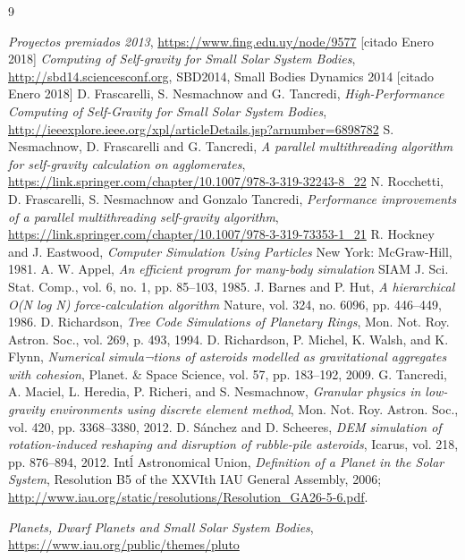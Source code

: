 \documentclass[a4paper,11pt]{book}
\begin{document}
\begin{thebibliography}{9}

	 \textit{Proyectos premiados 2013}, \url{https://www.fing.edu.uy/node/9577} [citado Enero  2018]
	 \textit{Computing of Self-gravity for Small Solar System Bodies}, \url{http://sbd14.sciencesconf.org}, SBD2014, Small Bodies Dynamics 2014 [citado Enero  2018]
	 D. Frascarelli, S. Nesmachnow and G. Tancredi, \textit{High-Performance Computing of Self-Gravity for Small Solar System Bodies}, \url{http://ieeexplore.ieee.org/xpl/articleDetails.jsp?arnumber=6898782}
	 S. Nesmachnow, D. Frascarelli and G. Tancredi, \textit{A parallel multithreading algorithm for self-gravity calculation on agglomerates}, \url{https://link.springer.com/chapter/10.1007/978-3-319-32243-8_22}
	 N. Rocchetti, D. Frascarelli, S. Nesmachnow and Gonzalo Tancredi, \textit{Performance improvements of a parallel multithreading self-gravity algorithm}, \url{https://link.springer.com/chapter/10.1007/978-3-319-73353-1_21}
	 R. Hockney and J. Eastwood, \textit{Computer Simulation Using Particles} New York: McGraw-Hill, 1981.
	 A. W. Appel, \textit{An efficient program for many-body simulation} SIAM J. Sci. Stat. Comp., vol. 6, no. 1, pp. 85–103, 1985.
	 J. Barnes and P. Hut, \textit{A hierarchical O(N log N) force-calculation algorithm} Nature, vol. 324, no. 6096, pp. 446–449, 1986.
	 D. Richardson, \textit{Tree Code Simulations of Planetary Rings}, Mon. Not. Roy. Astron. Soc., vol. 269, p. 493, 1994.
	 D. Richardson, P. Michel, K. Walsh, and K. Flynn, \textit{Numerical simula¬tions of asteroids modelled as gravitational aggregates with cohesion}, Planet. \& Space Science, vol. 57, pp. 183–192, 2009.
	 G. Tancredi, A. Maciel, L. Heredia, P. Richeri, and S. Nesmachnow, \textit{Granular physics in low-gravity environments using discrete element method}, Mon. Not. Roy. Astron. Soc., vol. 420, pp. 3368–3380, 2012.
	 D. Sánchez and D. Scheeres, \textit{DEM simulation of rotation-induced reshaping and disruption of rubble-pile asteroids}, Icarus, vol. 218, pp. 876–894, 2012.
	 Int\'l Astronomical Union, \textit{Definition of a Planet in the Solar System}, Resolution B5 of the XXVIth IAU General Assembly, 2006; \url{http://www.iau.org/static/resolutions/Resolution_GA26-5-6.pdf}.

	 \textit{Planets, Dwarf Planets and Small Solar System Bodies}, \url{https://www.iau.org/public/themes/pluto}


\end{thebibliography}
\end{document}
